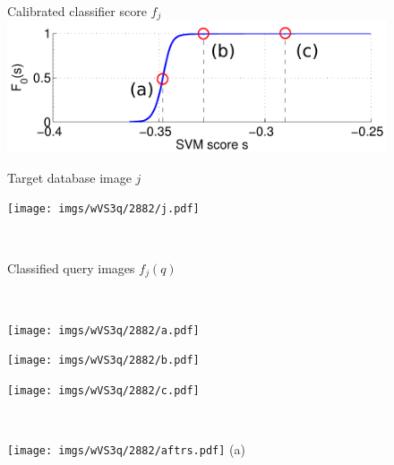   \begin{figure}%
  \begin{minipage}{0.48\linewidth}
          \begin{minipage}{0.65\linewidth}
            \centering
            {\scriptsize Calibrated classifier score $f_j$}
            \\
            \vspace{2mm}
            \includegraphics[width=\linewidth]{imgs/wVS3q/2882/graphBigO.pdf}
          \end{minipage} 
          \begin{minipage}{\wii}
            \centering
            \centerline{\scriptsize Target database image $j$}
            \texttt{[image: imgs/wVS3q/2882/j.pdf]}
          \end{minipage}  
          \vspace{3mm}
          \\
          \centerline{\scriptsize Classified query images $f_j(q)$} 
          \\
          \begin{minipage}{\wii}
            \centering
            \texttt{[image: imgs/wVS3q/2882/a.pdf]}
          \end{minipage}
          \begin{minipage}{\wii}
            \centering
            \texttt{[image: imgs/wVS3q/2882/b.pdf]}
          \end{minipage}
          \begin{minipage}{\wii}
            \centering
            \texttt{[image: imgs/wVS3q/2882/c.pdf]}
          \end{minipage} 
          \\
          \begin{minipage}{\wii}
            \centering
            \texttt{[image: imgs/wVS3q/2882/aftrs.pdf]}
            \newline
            (a)
          \end{minipage}  
          \begin{minipage}{\wii}

\end{minipage}
\end{minipage}
\end{figure}
